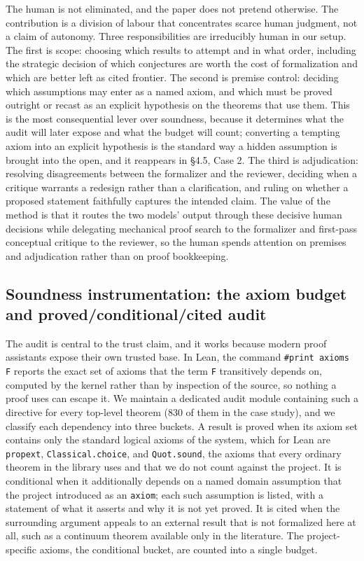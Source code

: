 \documentclass[11pt]{article}
\begin{document}
The human is not eliminated, and the paper does not pretend otherwise. The contribution is a
division of labour that concentrates scarce human judgment, not a claim of autonomy. Three
responsibilities are irreducibly human in our setup. The first is scope: choosing which results to
attempt and in what order, including the strategic decision of which conjectures are worth the cost
of formalization and which are better left as cited frontier. The second is premise control:
deciding which assumptions may enter as a named axiom, and which must be proved outright or recast
as an explicit hypothesis on the theorems that use them. This is the most consequential lever over
soundness, because it determines what the audit will later expose and what the budget will count;
converting a tempting axiom into an explicit hypothesis is the standard way a hidden assumption is
brought into the open, and it reappears in §4.5, Case 2. The third is adjudication: resolving
disagreements between the formalizer and the reviewer, deciding when a critique warrants a redesign
rather than a clarification, and ruling on whether a proposed statement faithfully captures the
intended claim. The value of the method is that it routes the two models' output through these
decisive human decisions while delegating mechanical proof search to the formalizer and
first-pass conceptual critique to the reviewer, so the human spends attention on premises and
adjudication rather than on proof bookkeeping.

\subsection{Soundness instrumentation: the axiom budget and proved/conditional/cited audit}

The audit is central to the trust claim, and it works because modern proof assistants expose their
own trusted base. In Lean, the command \texttt{\#print axioms F} reports the exact set of axioms that the
term \texttt{F} transitively depends on, computed by the kernel rather than by inspection of the source,
so nothing a proof uses can escape it. We maintain a dedicated audit module containing such a
directive for every top-level theorem (830 of them in the case study), and we classify each
dependency into three buckets. A result is proved when its axiom set contains only the standard
logical axioms of the system, which for Lean are \texttt{propext}, \texttt{Classical.choice}, and \texttt{Quot.sound},
the axioms that every ordinary theorem in the library uses and that we do not count against the
project. It is conditional when it additionally depends on a named domain assumption that the
project introduced as an \texttt{axiom}; each such assumption is listed, with a statement of what it
asserts and why it is not yet proved. It is cited when the surrounding argument appeals to an
external result that is not formalized here at all, such as a continuum theorem available only in
the literature. The project-specific axioms, the conditional bucket, are counted into a single
budget.
\end{document}
